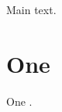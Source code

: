 \documentclass{article}
\begin{document}
Main text.


\bibliographyunit[\section]
\section{One}
One \cite{zeta}.
\end{document}
